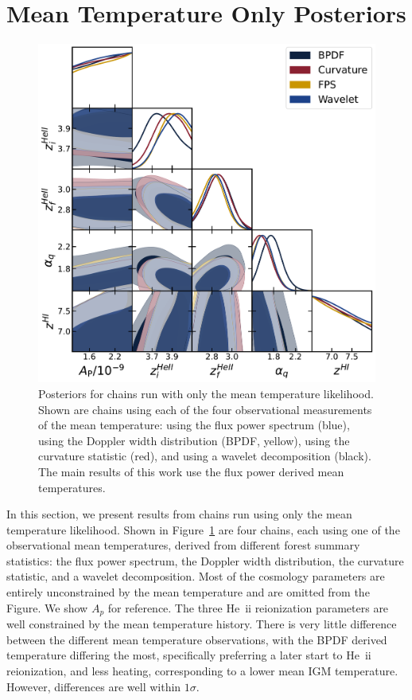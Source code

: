 \section{Mean Temperature Only Posteriors}\label{sec:t0-only}

\begin{figure}
    \centering
    \includegraphics[width=\textwidth]{figures/datasets_t0_corner.pdf}
    \caption{\label{fig:t0_datasets}
    Posteriors for chains run with only the mean temperature likelihood.
    Shown are chains using each of the four observational measurements of the mean temperature: using the flux power spectrum (blue), using the Doppler width distribution (BPDF, yellow), using the curvature statistic (red), and using a wavelet decomposition (black).
    The main results of this work use the flux power derived mean temperatures.
    }
\end{figure}

In this section, we present results from chains run using only the mean temperature likelihood.
Shown in Figure~\ref{fig:t0_datasets} are four chains, each using one of the observational mean temperatures, derived from different \lya forest summary statistics: the flux power spectrum, the Doppler width distribution, the curvature statistic, and a wavelet decomposition.
Most of the cosmology parameters are entirely unconstrained by the mean temperature and are omitted from the Figure. We show $A_p$ for reference.
The three He~{\sc ii} reionization parameters are well constrained by the mean temperature history.
There is very little difference between the different mean temperature observations, with the BPDF derived temperature differing the most, specifically preferring a later start to He~{\sc ii} reionization, and less heating, corresponding to a lower mean IGM temperature. However, differences are well within $1\sigma$.

